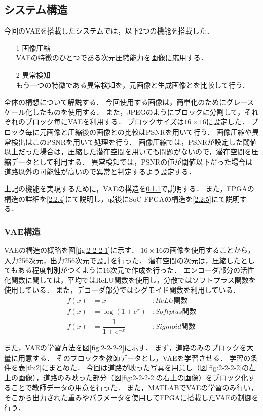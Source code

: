 \documentclass[paper]{ieicej}
\begin{document}
\subsection{システム構造}
今回のVAEを搭載したシステムでは，以下2つの機能を搭載した．
\begin{itemize}
  \item[1] 画像圧縮\\
  VAEの特徴のひとつである次元圧縮能力を画像に応用する．
  \item[2] 異常検知\\
  もう一つの特徴である異常検知を，元画像と生成画像とを比較して行う．  
\end{itemize}

全体の構想について解説する．
今回使用する画像は，簡単化のためにグレースケール化したものを使用する．
また，JPEGのようにブロックに分割して，それぞれのブロック毎にVAEを利用する．
ブロックサイズは$16\times16$に設定した．
ブロック毎に元画像と圧縮後の画像との比較はPSNRを用いて行う．
画像圧縮や異常検出はこのPSNRを用いて処理を行う．
画像圧縮では，PSNRが設定した閾値以上だった場合は，圧縮した潜在空間を用いても問題がないので，潜在空間を圧縮データとして利用する．
異常検知では，PSNRの値が閾値以下だった場合は道路以外の可能性が高いので異常と判定するよう設定する．

上記の機能を実現するために，VAEの構造を\ref{2.2.3}で説明する．
また，FPGAの構造の詳細を\ref{2.2.4}にて説明し，最後にSoC FPGAの構造を\ref{2.2.5}にて説明する．

\subsubsection{VAE構造}\label{2.2.3}
VAEの構造の概略を図\ref{fig:2-2-2-1}に示す．
$16×16$の画像を使用することから，入力256次元，出力256次元で設計を行った．
潜在空間の次元は，圧縮したとしてもある程度判別がつくように16次元で作成を行った．
エンコーダ部分の活性化関数に関しては，平均ではReLU関数を使用し，分散ではソフトプラス関数を使用している．
また，デコーダ部分ではシグモイド関数を利用している．
\begin{align}
  f(x) &= x &: ReLU関数\\
  f(x) &= \log(1+e^x) &: Softplus関数 \label{sq:2}\\
  f(x) &= \dfrac{1}{1+e^{-x}} &: Sigmoid関数 \label{sq:3}
\end{align}

また，VAEの学習方法を図\ref{fig:2-2-2-2}に示す．
まず，道路のみのブロックを大量に用意する．
そのブロックを教師データとし，VAEを学習させる．
学習の条件を表\ref{tb:2}にまとめた．
今回は道路が映った写真を用意し（図\ref{fig:2-2-2-2}の左上の画像），道路のみ映った部分（図\ref{fig:2-2-2-2}の右上の画像）をブロック化することで教師データの用意を行った．
また，MATLABでVAEの学習のみ行い，そこから出力された重みやパラメータを使用してFPGAに搭載したVAEの制御を行う．
\end{document}
